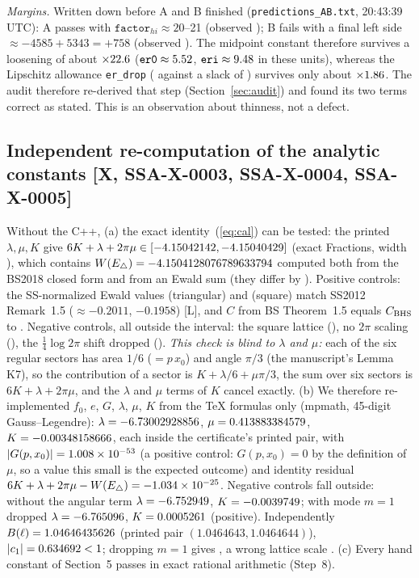 \documentclass[10pt]{article}
\newcommand{\tier}[1]{\textsf{[#1]}}
\begin{document}
\emph{Margins.} Written down before A and B finished (\texttt{predictions\_AB.txt}, 20:43:39 UTC): A passes with $\texttt{factor}_{hi}\approx20$--21 (observed \SSAFactorAObs); B fails with a final left side $\approx-4585+5343=+758$ (observed \SSABObs). The midpoint constant therefore survives a loosening of about $\times22.6$ ($\texttt{er0}\approx5.52$, $\texttt{eri}\approx9.48$ in these units), whereas the Lipschitz allowance \texttt{er\_drop} (\SSAAllow{} against a slack of \SSASlack) survives only about $\times1.86$.
The audit therefore re-derived that step (Section~\ref{sec:audit}) and found its two terms correct as stated. This is an observation about thinness, not a defect.

\subsection{Independent re-computation of the analytic constants \tier{X, SSA-X-0003, SSA-X-0004, SSA-X-0005}}
Without the C++, (a) the exact identity~(\ref{eq:cal}) can be tested: the printed $\lambda,\mu,K$ give $6K+\lambda+2\pi\mu\in[-4.15042142,-4.15040429]$ (exact Fractions, width \SSACalWidth), which contains $W(E_\triangle)=-4.1504128076789633794$ computed both from the BS2018 closed form and from an Ewald sum (they differ by \SSAEwaldDiff). Positive controls: the SS-normalized Ewald values \SSASSTri{} (triangular) and \SSASSSq{} (square) match SS2012 Remark~1.5 ($\approx-0.2011$, $-0.1958$) \tier{L}, and $C$ from BS Theorem~1.5 equals $C_{\rm BHS}$ to \SSACdiff. Negative controls, all outside the interval: the square lattice (\SSANegSquare), no $2\pi$ scaling (\SSANegNoTwoPi), the $\tfrac14\log2\pi$ shift dropped (\SSANegShift). \emph{This check is blind to $\lambda$ and $\mu$:} each of the six regular sectors has area $1/6$ ($=p\,x_0$) and angle $\pi/3$ (the manuscript's Lemma K7), so the contribution of a sector is $K+\lambda/6+\mu\pi/3$, the sum over six sectors is $6K+\lambda+2\pi\mu$, and the $\lambda$ and $\mu$ terms of $K$ cancel exactly.
(b) We therefore re-implemented $f_0$, $e$, $G$, $\lambda$, $\mu$, $K$ from the TeX formulas only (mpmath, 45-digit Gauss--Legendre): $\lambda=-6.73002928856$, $\mu=0.413883384579$, $K=-0.00348158666$, each inside the certificate's printed pair, with $|G(p,x_0)|=1.008\times10^{-53}$ (a positive control: $G(p,x_0)=0$ by the definition of $\mu$, so a value this small is the expected outcome) and identity residual $6K+\lambda+2\pi\mu-W(E_\triangle)=-1.034\times10^{-25}$. Negative controls fall outside: without the angular term $\lambda=-6.752949$, $K=-0.0039749$; with mode $m=1$ dropped $\lambda=-6.765096$, $K=0.0005261$ (positive). Independently $B(\ell)=1.04646435626$ (printed pair $(1.0464643,1.0464644)$), $|c_1|=0.634692{}<1$; dropping $m=1$ gives \SSABlNegA, a wrong lattice scale \SSABlNegB. (c) Every hand constant of Section~5 passes in exact rational arithmetic (Step~8).
\end{document}
